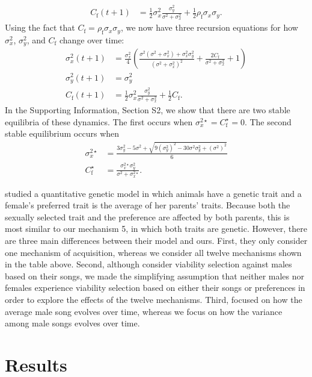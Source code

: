 \documentclass[12pt]{article}
\newcommand{\x}[1]{\text{#1}}
\begin{document}
\begin{align*}
C_\x{f}(t+1)&=\frac{1}{2}\sigma_{x}^2\frac{\sigma_{y}^2}{\sigma^2+\sigma_{x}^2}+\frac{1}{2}\rho_\x{f}\sigma_{x}\sigma_{y}.
\end{align*} 
Using the fact that $C_\x{f}=\rho_\x{f}\sigma_{x}\sigma_{y}$, we now have three recursion equations for how $\sigma_{x}^2$, $\sigma_{y}^2$, and $C_\x{f}$ change over time:
\begin{align*}
\sigma_x^2(t+1)&=\frac{\sigma_x^2}{4}\left(\frac{\sigma^2(\sigma^2+\sigma_{x}^2)+\sigma_{x}^2\sigma_{y}^2}{(\sigma^2+\sigma_{x}^2)^2}+\frac{2C_\x{f}}{\sigma^2+\sigma_x^2}+1\right)
\\ \sigma_y^2(t+1)&=\sigma_y^2
\\ C_\x{f}(t+1)&=\frac{1}{2}\sigma_{x}^2\frac{\sigma_{y}^2}{\sigma^2+\sigma_{x}^2}+\frac{1}{2}C_\x{f}.
\end{align*}
In the Supporting Information, Section S2, we show that there are two stable equilibria of these dynamics. The first occurs when $\sigma_x^{2\star}=C_\x{f}^\star=0$. The second stable equilibrium occurs when
\begin{align*}
\sigma_x^{2\star}&=\frac{3\sigma_y^2-5\sigma^2+\sqrt{9(\sigma_y^2)^2-30\sigma^2\sigma_y^2+(\sigma^2)^2}}{6}
\\ C_\x{f}^\star&=\frac{\sigma_x^{2\star}\sigma_y^2}{\sigma^2+\sigma_x^{2\star}}.
\end{align*}

\citet{Aoki:2001ly} studied a quantitative genetic model in which animals have a genetic trait and a female's preferred trait is the average of her parents' traits. Because both the sexually selected trait and the preference are affected by both parents, this is most similar to our mechanism 5, in which both traits are genetic. However, there are three main differences between their model and ours. First, they only consider one mechanism of acquisition, whereas we consider all twelve mechanisms shown in the table above. Second, although \citet{Aoki:2001ly} consider viability selection against males based on their songs, we made the simplifying assumption that neither males nor females experience viability selection based on either their songs or preferences in order to explore the effects of the twelve mechanisms. Third, \citet{Aoki:2001ly} focused on how the average male song evolves over time, whereas we focus on how the variance among male songs evolves over time.


\section*{Results}
\end{document}
